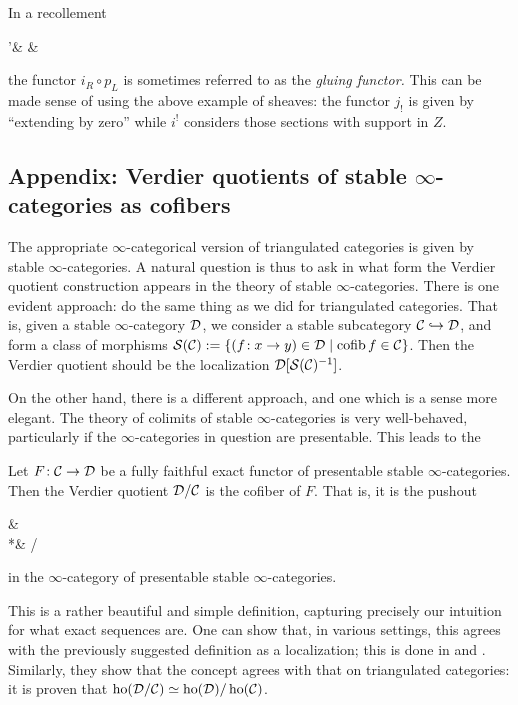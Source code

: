 In a recollement
\begin{diagram*}[column sep=large]
	\calT'\ar[r,"i" description,""{below,name=A},""{above,name=AA}] &
		\calT \ar[r,"p" description,""{below,name=C},""{above,name=CC}]\ar[l,bend left,shift left,"i_R",""{above,name=B}]\ar[l,bend right,shift right,"i_L"',""{below,name=BB}] &
		 \ar[l,bend left,shift left,"p_R",""{above,name=D}]\ar[l,bend right,shift right,"p_L"',""{below,name=DD}]
		\ar[from=B,to=A,symbol=\vdash]\ar[from=D,to=C,symbol=\vdash]
		\ar[from=AA,to=BB,symbol=\vdash]\ar[from=CC,to=DD,symbol=\vdash]
\end{diagram*}
the functor \(i_R\circ p_L\) is sometimes referred to as the \emph{gluing functor.} This can be made sense of using the above example of sheaves: the functor \(j_!\) is given
by ``extending by zero'' while \(i^!\) considers those sections with support in \(Z\).

\subsection{Appendix: Verdier quotients of stable \(\infty\)-categories as cofibers}
The appropriate \(\infty\)-categorical version of triangulated categories is given by stable \(\infty\)-categories. A natural question is thus to ask in
what form the Verdier quotient construction appears in the theory of stable \(\infty\)-categories. There is one evident approach: do the same thing as we did
for triangulated categories. That is, given a stable \(\infty\)-category \(\mathcal{D}\), we consider a stable subcategory \(\mathcal{C}\hookrightarrow\mathcal{D}\), and form
a class of morphisms \(\mathcal{S}(\mathcal{C}) := \{ (f\!:x\to y)\in\mathcal{D}\mid \operatorname{cofib}{f}\in\mathcal{C} \}\). Then the Verdier quotient should be the localization \(\mathcal{D}[\mathcal{S}(\mathcal{C})^{-1}]\).

On the other hand, there is a different approach, and one which is a sense more elegant. The theory of colimits of stable \(\infty\)-categories is very well-behaved,
particularly if the \(\infty\)-categories in question are presentable. This leads to the
\begin{definition}
	Let \(F\!:\mathcal{C}\to\mathcal{D}\) be a fully faithful exact functor of presentable stable \(\infty\)-categories. Then the Verdier quotient \(\mathcal{D}/\mathcal{C}\)
	is the cofiber of \(F\). That is, it is the pushout
	\begin{diagram*}
		\calC\ar[r,"F"]\ar[d] & \calD\ar[d] \\
		*\ar[r] & \calD/\calC\ar[ul,pushout]
	\end{diagram*}
	in the \(\infty\)-category of presentable stable \(\infty\)-categories.
\end{definition}
This is a rather beautiful and simple definition, capturing precisely our intuition for what exact sequences are. One can show that, in various settings,
this agrees with the previously suggested definition as a localization; this is done in \cite{Blumberg_Gepner_Tabuada_2013} and \cite{drew2015verdierquotientsstablequasicategories}.
Similarly, they show that the concept agrees with that on triangulated categories: it is proven that \(\operatorname{ho}(\mathcal{D}/\mathcal{C})\simeq\operatorname{ho}(\mathcal{D})/\operatorname{ho}(\mathcal{C})\).
